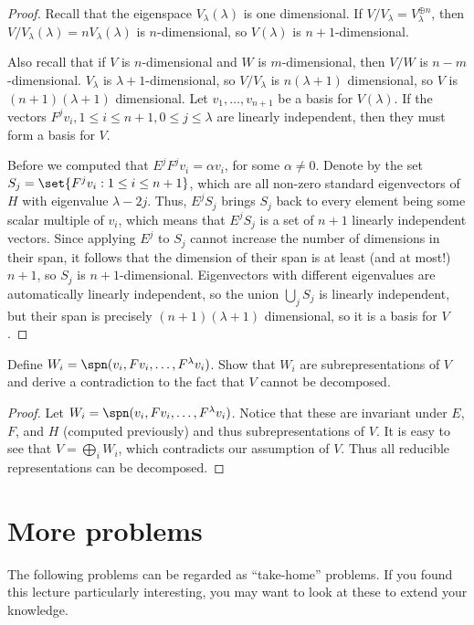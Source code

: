 \documentclass{article}
\begin{document}
\begin{proof}
Recall that the eigenspace $V_{\lambda}(\lambda)$ is one dimensional. If $V /
V_{\lambda} = V_{\lambda}^{\oplus n}$, then $V / V_{\lambda} (\lambda) = n
V_{\lambda} (\lambda)$ is $n$-dimensional, so $V(\lambda)$ is $n +
1$-dimensional.

Also recall that if $V$ is $n$-dimensional and $W$ is $m$-dimensional, then $V /
W$ is $n - m$-dimensional. $V_{\lambda}$ is $\lambda + 1$-dimensional, so $V /
V_{\lambda}$ is $n (\lambda + 1)$ dimensional, so $V$ is $(n + 1)(\lambda + 1)$
dimensional. Let $v_1, \dots, v_{n + 1}$ be a basis for $V(\lambda)$. If the
vectors $F^j v_i, 1 \leq i \leq n + 1, 0 \leq j \leq \lambda$ are linearly
independent, then they must form a basis for $V$.

Before we computed that $E^j F^j v_i = \alpha v_i$, for some $\alpha \neq 0$.
Denote by the set $S_j = \set{F^j v_i : 1 \leq i \leq n + 1}$, which are all
non-zero standard eigenvectors of $H$ with eigenvalue $\lambda - 2j$. Thus, $E^j
S_j$ brings $S_j$ back to every element being some scalar multiple of $v_i$,
which means that $E^j S_j$ is a set of $n + 1$ linearly independent vectors.
Since applying $E^j$ to $S_j$ cannot increase the number of dimensions in their
span, it follows that the dimension of their span is at least (and at most!) $n
+ 1$, so $S_j$ is $n + 1$-dimensional. Eigenvectors with different eigenvalues
are automatically linearly independent, so the union $\bigcup_j S_j$ is linearly
independent, but their span is precisely $(n + 1)(\lambda + 1)$ dimensional, so
it is a basis for $V$.
\end{proof}

\begin{prop}
Define $W_i = \spn(v_i, Fv_i, \dots, F^{\lambda} v_i)$. Show that $W_i$ are
subrepresentations of $V$ and derive a contradiction to the fact that $V$ cannot
be decomposed.
\end{prop}

\begin{proof}
Let $W_i = \spn(v_i, F v_i, \dots, F^{\lambda} v_i)$. Notice that these are
invariant under $E$, $F$, and $H$ (computed previously) and thus
subrepresentations of $V$. It is easy to see that $V = \bigoplus_i W_i$, which
contradicts our assumption of $V$. Thus all reducible representations can be
decomposed.
\end{proof}

\newpage
\section{More problems}
The following problems can be regarded as ``take-home'' problems. If you found
this lecture particularly interesting, you may want to look at these to extend
your knowledge.
\end{document}
